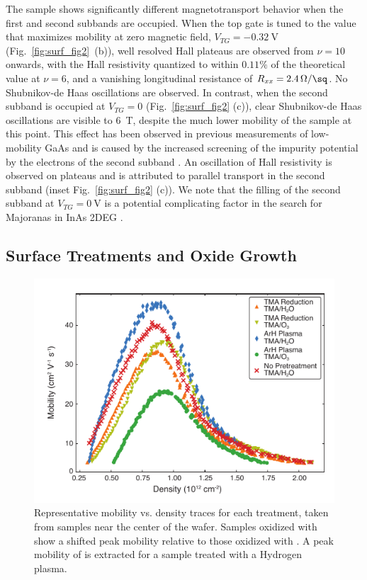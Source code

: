 The sample shows significantly different magnetotransport behavior when the first and second subbands are occupied. When the top gate is tuned to the value that maximizes mobility at zero magnetic field, $V_{TG} = \SI{-0.32}{\volt}$ (Fig.~\ref{fig:surf_fig2}~(b)), well resolved Hall plateaus are observed from $\nu = 10$ onwards, with the Hall resistivity quantized to within $0.11\%$ of the theoretical value at $\nu = 6$, and a vanishing longitudinal resistance of $R_{xx} = \SI[per-mode=symbol]{2.4}{\ohm\per\sq}$. No Shubnikov-de Haas oscillations are observed. In contrast, when the second subband is occupied at $V_{TG} = 0$ (Fig.~\ref{fig:surf_fig2} (c)), clear Shubnikov-de Haas oscillations are visible to \SI{6}{\tesla}, despite the much lower mobility of the sample at this point. This effect has been observed in previous measurements of low-mobility GaAs and is caused by the increased screening of the impurity potential by the electrons of the second subband \cite{PhysRevB.38.7866}. An oscillation of Hall resistivity is observed on plateaus and is attributed to parallel transport in the second subband (inset Fig.~\ref{fig:surf_fig2} (c)). We note that the filling of the second subband at $V_{TG} = \SI{0}{\volt}$ is a potential complicating factor in the search for Majoranas in InAs 2DEG \cite{s41578-018-0003-1}.

\subsection{\label{sec:surf_treat}Surface Treatments and Oxide Growth}

\begin{figure}
    \includegraphics[width=0.6\linewidth]{Figure3}
    \caption[Representative mobility vs. density traces for each treatment]{\label{fig:surf_fig3} Representative mobility vs. density traces for each treatment, taken from samples near the center of the wafer. Samples oxidized with  show a shifted peak mobility relative to those oxidized with . A peak mobility of  is extracted for a sample treated with a Hydrogen plasma.}
\end{figure}

